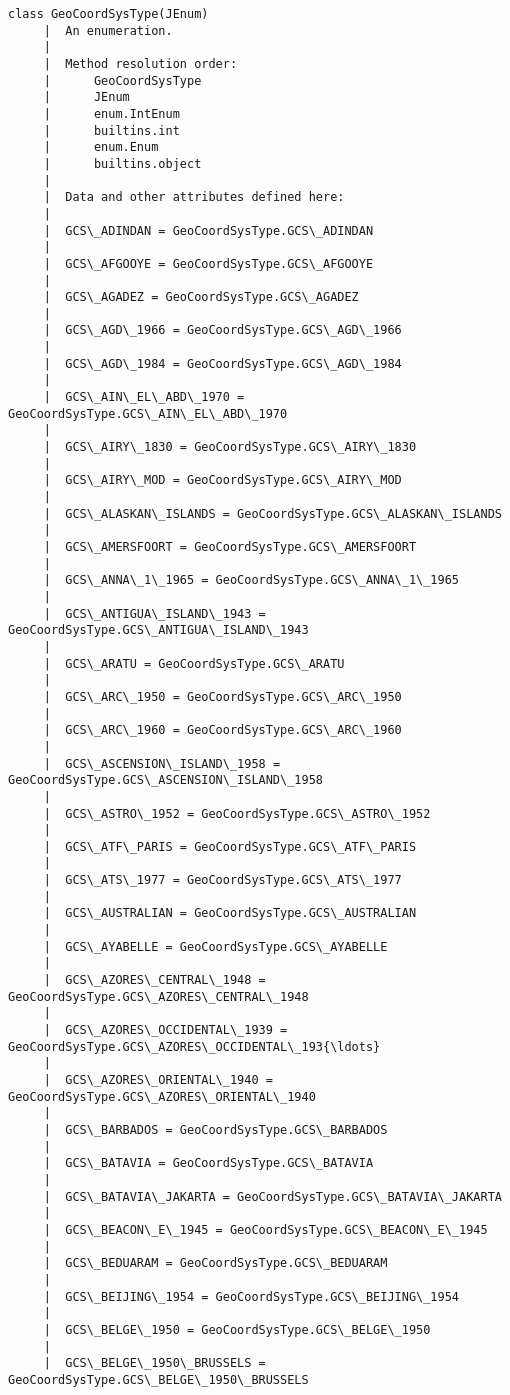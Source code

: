 \documentclass[11pt]{article}
\begin{document}
\begin{Verbatim}[commandchars=\\\{\}]
    class GeoCoordSysType(JEnum)
     |  An enumeration.
     |  
     |  Method resolution order:
     |      GeoCoordSysType
     |      JEnum
     |      enum.IntEnum
     |      builtins.int
     |      enum.Enum
     |      builtins.object
     |  
     |  Data and other attributes defined here:
     |  
     |  GCS\_ADINDAN = GeoCoordSysType.GCS\_ADINDAN
     |  
     |  GCS\_AFGOOYE = GeoCoordSysType.GCS\_AFGOOYE
     |  
     |  GCS\_AGADEZ = GeoCoordSysType.GCS\_AGADEZ
     |  
     |  GCS\_AGD\_1966 = GeoCoordSysType.GCS\_AGD\_1966
     |  
     |  GCS\_AGD\_1984 = GeoCoordSysType.GCS\_AGD\_1984
     |  
     |  GCS\_AIN\_EL\_ABD\_1970 = GeoCoordSysType.GCS\_AIN\_EL\_ABD\_1970
     |  
     |  GCS\_AIRY\_1830 = GeoCoordSysType.GCS\_AIRY\_1830
     |  
     |  GCS\_AIRY\_MOD = GeoCoordSysType.GCS\_AIRY\_MOD
     |  
     |  GCS\_ALASKAN\_ISLANDS = GeoCoordSysType.GCS\_ALASKAN\_ISLANDS
     |  
     |  GCS\_AMERSFOORT = GeoCoordSysType.GCS\_AMERSFOORT
     |  
     |  GCS\_ANNA\_1\_1965 = GeoCoordSysType.GCS\_ANNA\_1\_1965
     |  
     |  GCS\_ANTIGUA\_ISLAND\_1943 = GeoCoordSysType.GCS\_ANTIGUA\_ISLAND\_1943
     |  
     |  GCS\_ARATU = GeoCoordSysType.GCS\_ARATU
     |  
     |  GCS\_ARC\_1950 = GeoCoordSysType.GCS\_ARC\_1950
     |  
     |  GCS\_ARC\_1960 = GeoCoordSysType.GCS\_ARC\_1960
     |  
     |  GCS\_ASCENSION\_ISLAND\_1958 = GeoCoordSysType.GCS\_ASCENSION\_ISLAND\_1958
     |  
     |  GCS\_ASTRO\_1952 = GeoCoordSysType.GCS\_ASTRO\_1952
     |  
     |  GCS\_ATF\_PARIS = GeoCoordSysType.GCS\_ATF\_PARIS
     |  
     |  GCS\_ATS\_1977 = GeoCoordSysType.GCS\_ATS\_1977
     |  
     |  GCS\_AUSTRALIAN = GeoCoordSysType.GCS\_AUSTRALIAN
     |  
     |  GCS\_AYABELLE = GeoCoordSysType.GCS\_AYABELLE
     |  
     |  GCS\_AZORES\_CENTRAL\_1948 = GeoCoordSysType.GCS\_AZORES\_CENTRAL\_1948
     |  
     |  GCS\_AZORES\_OCCIDENTAL\_1939 = GeoCoordSysType.GCS\_AZORES\_OCCIDENTAL\_193{\ldots}
     |  
     |  GCS\_AZORES\_ORIENTAL\_1940 = GeoCoordSysType.GCS\_AZORES\_ORIENTAL\_1940
     |  
     |  GCS\_BARBADOS = GeoCoordSysType.GCS\_BARBADOS
     |  
     |  GCS\_BATAVIA = GeoCoordSysType.GCS\_BATAVIA
     |  
     |  GCS\_BATAVIA\_JAKARTA = GeoCoordSysType.GCS\_BATAVIA\_JAKARTA
     |  
     |  GCS\_BEACON\_E\_1945 = GeoCoordSysType.GCS\_BEACON\_E\_1945
     |  
     |  GCS\_BEDUARAM = GeoCoordSysType.GCS\_BEDUARAM
     |  
     |  GCS\_BEIJING\_1954 = GeoCoordSysType.GCS\_BEIJING\_1954
     |  
     |  GCS\_BELGE\_1950 = GeoCoordSysType.GCS\_BELGE\_1950
     |  
     |  GCS\_BELGE\_1950\_BRUSSELS = GeoCoordSysType.GCS\_BELGE\_1950\_BRUSSELS

\end{Verbatim}
\end{document}
